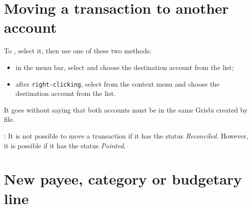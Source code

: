 \section{Moving a transaction to another account\label{transactions-move}}

To , select it, then use one of these two methods:
\begin{itemize}
	\item in the menu bar, select  and choose the destination account from the list;
	\item after \texttt{right-clicking}, select  from the context menu and choose the destination account from the list.
\end{itemize}

It goes without saying that both accounts must be in the same Grisbi created by file.

\Note{}: It is not possible to move a transaction if it has the status \emph{Reconciled}. However, it is possible if it has the status \emph{Pointed}.


\section{New payee, category or budgetary line\label{transactions-fillcombo}}


